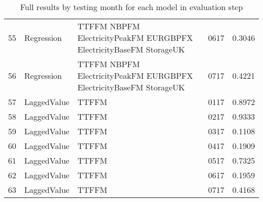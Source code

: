 \begin{table}[ht]
\begin{tabular}{rlllr}
  55 & Regression & TTFFM NBPFM ElectricityPeakFM EURGBPFX ElectricityBaseFM StorageUK & 0617 & 0.3046 \\ 
  56 & Regression & TTFFM NBPFM ElectricityPeakFM EURGBPFX ElectricityBaseFM StorageUK & 0717 & 0.4221 \\ 
  57 & LaggedValue & TTFFM  & 0117 & 0.8972 \\ 
  58 & LaggedValue & TTFFM  & 0217 & 0.9333 \\ 
  59 & LaggedValue & TTFFM  & 0317 & 0.1108 \\ 
  60 & LaggedValue & TTFFM  & 0417 & 0.1909 \\ 
  61 & LaggedValue & TTFFM  & 0517 & 0.7325 \\ 
  62 & LaggedValue & TTFFM  & 0617 & 0.1959 \\ 
  63 & LaggedValue & TTFFM  & 0717 & 0.4168 \\ 
   \hline
\end{tabular}
\caption{Full results by testing month for each model in evaluation step} 
\label{tab:binary.eval.short}
\end{table}
